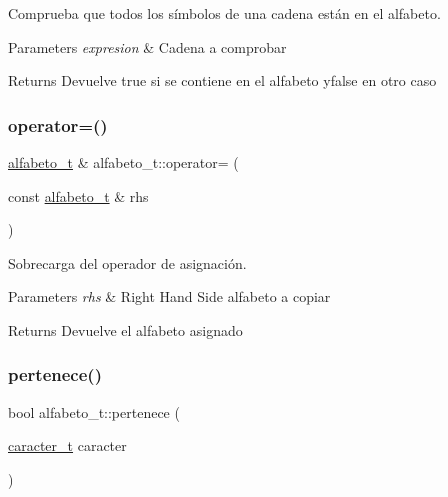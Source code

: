 Comprueba que todos los símbolos de una cadena están en el alfabeto. 


\begin{DoxyParams}{Parameters}
{\em expresion} & Cadena a comprobar \\
\hline
\end{DoxyParams}
\begin{DoxyReturn}{Returns}
Devuelve true si se contiene en el alfabeto yfalse en otro caso 
\end{DoxyReturn}
\mbox{\label{classalfabeto__t_abcd2337bc32e65f65f39c02153d80a79}} 
\subsubsection{\texorpdfstring{operator=()}{operator=()}}
{\footnotesize\ttfamily \hyperlink{classalfabeto__t}{alfabeto\+\_\+t} \& alfabeto\+\_\+t\+::operator= (\begin{DoxyParamCaption}\item[{const \hyperlink{classalfabeto__t}{alfabeto\+\_\+t} \&}]{rhs }\end{DoxyParamCaption})}



Sobrecarga del operador de asignación. 


\begin{DoxyParams}{Parameters}
{\em rhs} & Right Hand Side alfabeto a copiar \\
\hline
\end{DoxyParams}
\begin{DoxyReturn}{Returns}
Devuelve el alfabeto asignado 
\end{DoxyReturn}
\mbox{\label{classalfabeto__t_aa9a6528f5c910f2e68e658606b541a19}} 
\subsubsection{\texorpdfstring{pertenece()}{pertenece()}}
{\footnotesize\ttfamily bool alfabeto\+\_\+t\+::pertenece (\begin{DoxyParamCaption}\item[{\hyperlink{classcaracter__t}{caracter\+\_\+t}}]{caracter }\end{DoxyParamCaption})}



